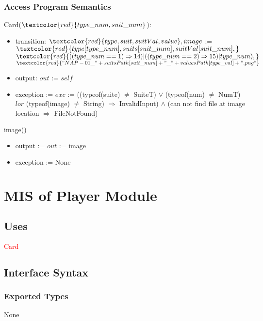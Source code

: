 \documentclass[12pt, titlepage]{article}
\begin{document}
\subsubsection{Access Program Semantics}
Card($\textcolor{red}{type\_num, suit\_num}$):
\begin{itemize}
    \item transition: $\textcolor{red}{type, suit, suitVal, value}, image$ :=\\ $\textcolor{red}{type[type\_num], suits[suit\_num], suitVal[suit\_num], }$\\
    $\textcolor{red}{((type\_num == 1) \Rightarrow 14) | ((type\_num == 2) \Rightarrow 15) | type\_num),}$\\
    $\textcolor{red}{"NAP-01\_"+ suitsPath[suit\_num] + "\_"+ valuesPath[type\_val] + ".png"}$
    \item output: $out$ := $self$
    \item exception := $exc$ := ((typeof(suite) $\neq$ SuiteT) $\lor$  (typeof(num) $\neq$ NumT) $lor$ (typeof(image) $\neq$ String) $\Rightarrow$ InvalidInput) $\land$ (can not find file at image location $\Rightarrow$ FileNotFound)
\end{itemize}

image()
\begin{itemize}
    \item output := $out$ := image
    \item exception := None
\end{itemize}

\section{MIS of Player Module}
\subsection{Uses}
\textcolor{red}{Card}
\subsection{Interface Syntax}
\subsubsection{Exported Types}
None
\end{document}
